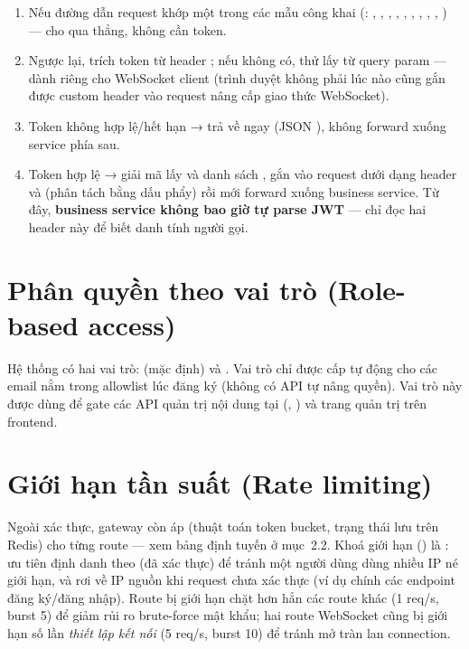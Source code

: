 \documentclass[12pt,a4paper]{report}
\begin{document}
\begin{enumerate}[nosep]
    \item Nếu đường dẫn request khớp một trong các mẫu công khai
    (: , ,
    , , ,
    , , ,
    , ) — cho qua thẳng, không cần token.
    \item Ngược lại, trích token từ header ;
    nếu không có, thử lấy từ query param  — dành riêng cho
    WebSocket client (trình duyệt không phải lúc nào cũng gắn được custom
    header vào request nâng cấp giao thức WebSocket).
    \item Token không hợp lệ/hết hạn → trả về ngay 
    (JSON ), không forward xuống service phía sau.
    \item Token hợp lệ → giải mã lấy  và danh sách ,
    gắn vào request dưới dạng header  và 
    (phân tách bằng dấu phẩy) rồi mới forward xuống business service. Từ đây,
    \textbf{business service không bao giờ tự parse JWT} — chỉ đọc hai header
    này để biết danh tính người gọi.
\end{enumerate}

\section{Phân quyền theo vai trò (Role-based access)}

Hệ thống có hai vai trò:  (mặc định) và . Vai trò
 chỉ được cấp tự động cho các email nằm trong allowlist
 lúc đăng ký (không có API tự nâng quyền). Vai trò này được
dùng để gate các API quản trị nội dung tại 
(, )
và trang quản trị trên frontend.

\section{Giới hạn tần suất (Rate limiting)}

Ngoài xác thực, gateway còn áp  (thuật toán token
bucket, trạng thái lưu trên Redis) cho từng route — xem bảng định tuyến ở
mục~2.2. Khoá giới hạn () là :
ưu tiên định danh theo  (đã xác thực) để tránh một người dùng
dùng nhiều IP né giới hạn, và rơi về IP nguồn khi request chưa xác thực (ví dụ
chính các endpoint đăng ký/đăng nhập). Route  bị giới hạn
chặt hơn hẳn các route khác (1 req/s, burst 5) để giảm rủi ro brute-force mật
khẩu; hai route WebSocket cũng bị giới hạn số lần \emph{thiết lập kết nối}
(5 req/s, burst 10) để tránh mở tràn lan connection.
\end{document}
